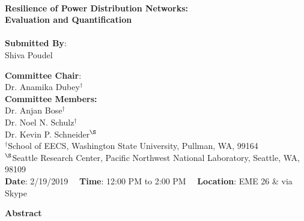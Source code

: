 \documentclass[12pt]{article}
\begin{document}
\begin{titlepage}

\HRule \\
{ \Large \bfseries Resilience of Power Distribution Networks: \\
\vspace{0.2 cm}
Evaluation and Quantification}\\[0.3cm] %
\HRule \\
 


\medskip
\large
{{\textbf{Submitted By}:\\ Shiva Poudel }}\\ [0.5cm]

\medskip

\textbf{Committee Chair}:\\ Dr. Anamika Dubey$^{\dagger}$ \\ [0.5 cm]
\textbf{Committee Members:} \\ Dr. Anjan Bose$^{\dagger}$\\
Dr. Noel N. Schulz$^{\dagger}$\\
Dr. Kevin P. Schneider$^{\S}$\\ 
\vspace{1.5 cm}
\small $^{\dagger}$School of EECS, Washington State University, Pullman, WA, 99164\\
\small $^{\S}$Seattle Research Center, Pacific Northwest National Laboratory, Seattle, WA, 98109\\
\vspace{1.0 cm}
\small
\textbf{Date}: 2/19/2019 \ \ \textbf{Time}: 12:00 PM to 2:00 PM \ \ \textbf{Location}: EME 26 \& via Skype


\vfill %
\end{titlepage}

\newpage

\textbf{\centering \large Abstract \\}
\end{document}
